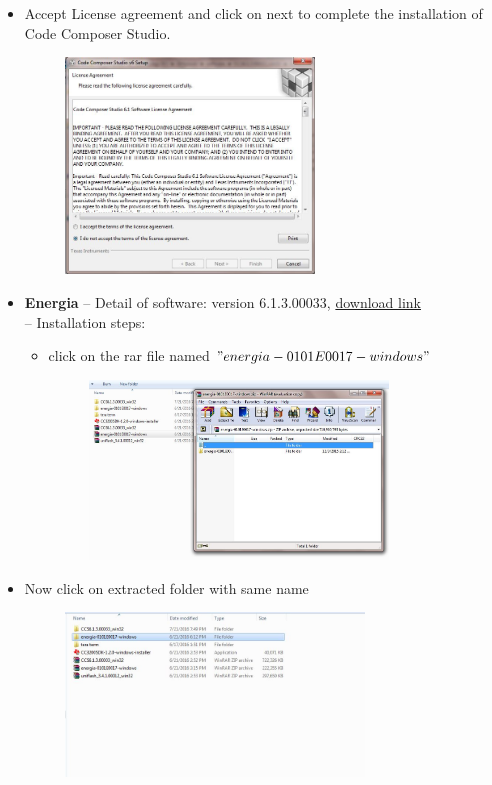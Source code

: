 \documentclass[a4paper,12pt,oneside]{book}
\begin{document}
\begin{enumerate}
\begin{itemize}
\begin{figure}[h]
  	 \end{figure}
  	 \item Accept License agreement and click on next to complete the installation of Code Composer Studio.
  	 \begin{figure}[h]
  	 		\hspace{2cm}
  	 	\includegraphics[width=250px]{inst4}
  	  \end{figure} 
  	  \newpage
  	  \item \textbf{Energia}
  	   -- Detail of software: version 6.1.3.00033, \href{http://www.energia.nu}{download link}\\
  	   -- Installation steps:
  	   \begin{itemize}
  	   	\item click on the rar file named $"energia-0101E0017-windows"$
  	   	\begin{figure}[h]
  	   		\hspace{2cm}
  	   		\includegraphics[width=300px]{inst5}
  	   	\end{figure}
  	   \end{itemize}
  	   \item Now click on extracted folder with same name
  	   \begin{figure}[h]
  	   	\hspace{2cm}
  	   	\includegraphics[width=300px]{inst6}

\end{figure}
\end{itemize}
\end{enumerate}
\end{document}
